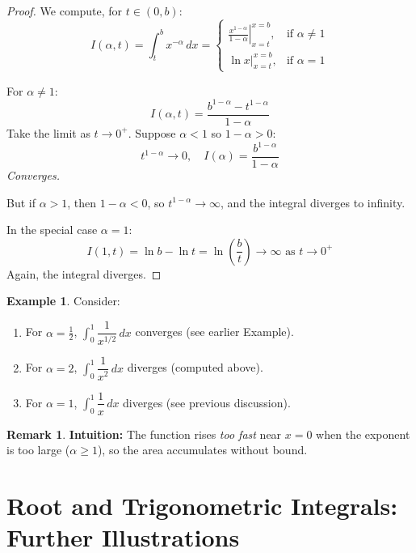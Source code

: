\documentclass[11pt,oneside]{article}
\theoremstyle{definition}
\newtheorem{example}[theorem]{Example}
\newtheorem{remark}[theorem]{Remark}
\theoremstyle{remark}
\begin{document}
\begin{proof}
We compute, for $t \in (0, b)$:
\[
I(\alpha, t) = \int_t^b x^{-\alpha}\,dx =
\begin{cases}
    \left. \frac{x^{1-\alpha}}{1-\alpha} \right|_{x=t}^{x=b}, & \text{if } \alpha \neq 1 \\
    \left. \ln x \right|_{x=t}^{x=b}, & \text{if } \alpha = 1
\end{cases}
\]

For $\alpha \neq 1$:
\[
I(\alpha, t) = \frac{b^{1-\alpha} - t^{1-\alpha}}{1-\alpha}
\]
Take the limit as $t \to 0^+$. Suppose $\alpha < 1$ so $1-\alpha>0$:
\[
t^{1-\alpha} \to 0, \quad I(\alpha) = \frac{b^{1-\alpha}}{1-\alpha}
\]
\emph{Converges.}

But if $\alpha > 1$, then $1-\alpha<0$, so $t^{1-\alpha} \to \infty$, and the integral diverges to infinity.

In the special case $\alpha=1$:
\[
I(1, t) = \ln b - \ln t = \ln\left(\frac{b}{t}\right) \to \infty \text{ as } t \to 0^+
\]
Again, the integral diverges.

\end{proof}

\begin{example}
Consider:
\begin{enumerate}
    \item For $\alpha = \frac{1}{2}$, $\int_0^1 \dfrac{1}{x^{1/2}}\,dx$ converges (see earlier Example).
    \item For $\alpha = 2$, $\int_0^1 \dfrac{1}{x^2}\,dx$ diverges (computed above).
    \item For $\alpha = 1$, $\int_0^1 \dfrac{1}{x}\,dx$ diverges (see previous discussion).
\end{enumerate}
\end{example}

\begin{remark}
\textbf{Intuition:} The function rises \emph{too fast} near $x=0$ when the exponent is too large ($\alpha \geq 1$), so the area accumulates without bound.
\end{remark}

\section{Root and Trigonometric Integrals: Further Illustrations}
\end{document}

